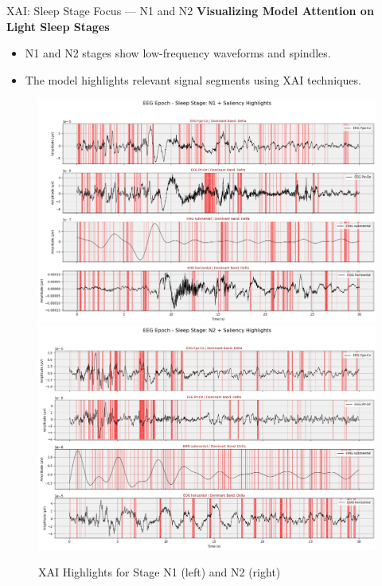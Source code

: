 \begin{frame}{XAI: Sleep Stage Focus — N1 and N2}
	\textbf{Visualizing Model Attention on Light Sleep Stages}
	\vspace{0.3cm}
	
	\begin{itemize}
		\item N1 and N2 stages show low-frequency waveforms and spindles.
		\item The model highlights relevant signal segments using XAI techniques.
	\end{itemize}
	
	\begin{figure}
		\centering
		\includegraphics[width=0.45\linewidth]{images/paper_3/stagen1.png}
		\includegraphics[width=0.45\linewidth]{images/paper_3/stagen2.png}
		\caption{XAI Highlights for Stage N1 (left) and N2 (right)}
	\end{figure}
\end{frame}

